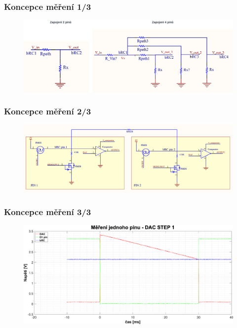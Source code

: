 \documentclass[%
  12pt,       				%
	t,                  %
	aspectratio=1610,   %
	unicode,						%
]{beamer}				    	%
\begin{document}
\begin{frame} 
	\frametitle{Koncepce měření 1/3}
	\vspace*{0.5cm}
	\begin{figure}[ht!]
		\centering
		\includegraphics[width = \textwidth]{obrazky/2_and_4_pins_connection.png}
	\end{figure}
\end{frame}

\begin{frame} 
	\frametitle{Koncepce měření 2/3}
	\vspace*{0.5cm}
	\begin{figure}[ht!]
		\centering
		\includegraphics[width = \textwidth]{obrazky/R_meas_obhj.png}
	\end{figure}
\end{frame}

\begin{frame} 
	\frametitle{Koncepce měření 3/3}
	\vspace*{0.5cm}
	\begin{figure}[ht!]
		\centering
		\includegraphics[width = \textwidth]{obrazky/matlab_generated/pin_step1.eps}
	\end{figure}
\end{frame}
\end{document}
